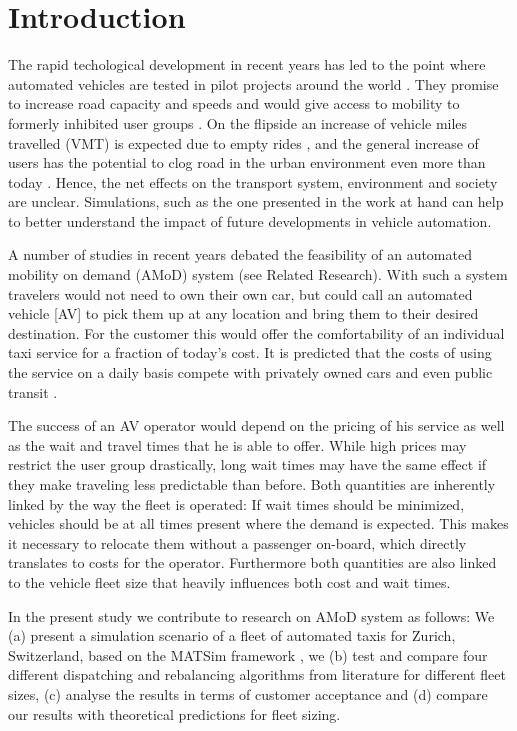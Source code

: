 \section{Introduction}

The rapid techological development in recent years has led to the point where
automated vehicles are tested in pilot projects around the world \citep{ackerman2017hail}.
They promise to increase road
capacity and speeds \citep{Tientrakool2011,Friedrich2015} and would give access to mobility to formerly
inhibited user groups \citep{Truong2017}. On the flipside an increase of vehicle
miles travelled (VMT) is expected due to empty rides \citep{Litman2014}, and the general increase
of users has the potential to clog road in the urban environment even more than today \citep{Meyer2017}.
Hence, the net effects on
the transport system, environment and society are unclear. Simulations, such as
the one presented in the work at hand can help to better understand the impact
of future developments in vehicle automation.

A number of studies in recent years debated the feasibility of an automated
mobility on demand (AMoD) system (see Related Research). With such a system travelers
would not need to own their own car, but could call an automated vehicle [AV] to pick
them up at any location and bring them to their desired destination. For the customer
this would offer the comfortability of an individual taxi service
for a fraction of today's cost. It is predicted that the costs of using the
service on a daily basis compete with privately owned cars and even
public transit \citep{Bosch2016a}.

The success of an AV operator would depend on the pricing of his service
as well as the wait and travel times that he is able to offer. While high prices
may restrict the user group drastically, long wait times may have the same effect
if they make traveling less predictable than before. Both quantities are inherently
linked by the way the fleet is operated: If wait times should be minimized, vehicles
should be at all times present where the demand is expected. This makes it necessary to
relocate them without a passenger on-board, which directly translates to costs for
the operator. Furthermore both quantities are also linked to the vehicle fleet
size that heavily influences both cost and wait times.

In the present study we contribute to research on AMoD system as follows: We
(a) present a simulation scenario of a fleet of automated taxis for Zurich, Switzerland,
based on the MATSim framework \citep{Horni2015}, we (b) test and compare four different dispatching
and rebalancing algorithms from literature for different fleet sizes, (c) analyse the results
in terms of customer acceptance and (d) compare our results with theoretical
predictions for fleet sizing.


